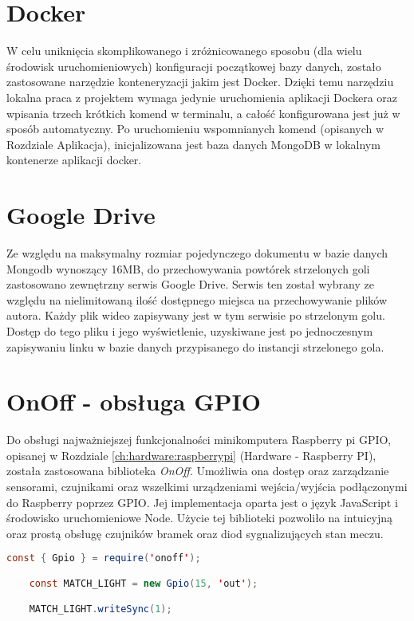 \label{section:docker}
\section{Docker}
W celu uniknięcia skomplikowanego i zróżnicowanego sposobu (dla wielu środowisk uruchomieniowych) konfiguracji początkowej bazy danych, zostało zastosowane narzędzie konteneryzacji jakim jest Docker. Dzięki temu narzędziu lokalna praca z projektem wymaga jedynie uruchomienia aplikacji Dockera oraz wpisania trzech krótkich komend w terminalu, a całość konfigurowana jest już w sposób automatyczny. Po uruchomieniu wspomnianych komend (opisanych w Rozdziale Aplikacja), inicjalizowana jest baza danych MongoDB w lokalnym kontenerze aplikacji docker.

\label{section:googleDrive}
\section{Google Drive}
Ze względu na maksymalny rozmiar pojedynczego dokumentu w bazie danych Mongodb wynoszący 16MB, do przechowywania powtórek strzelonych goli zastosowano zewnętrzny serwis Google Drive. Serwis ten został wybrany ze względu na nielimitowaną ilość dostępnego miejsca na przechowywanie plików autora. Każdy plik wideo zapisywany jest w tym serwisie po strzelonym golu. Dostęp do tego pliku i jego wyświetlenie, uzyskiwane jest po jednoczesnym zapisywaniu linku w bazie danych przypisanego do instancji strzelonego gola.

\section{OnOff - obsługa GPIO}
Do obsługi najważniejszej funkcjonalności minikomputera Raspberry pi GPIO, opisanej w Rozdziale \ref{ch:hardware:raspberrypi} (Hardware - Raspberry PI), została zastosowana biblioteka \textit{OnOff}. Umożliwia ona dostęp oraz zarządzanie sensorami, czujnikami oraz wszelkimi urządzeniami wejścia/wyjścia podłączonymi do Raspberry poprzez GPIO. Jej implementacja oparta jest o język JavaScript i środowisko uruchomieniowe Node. Użycie tej biblioteki pozwoliło na intuicyjną oraz prostą obsługę czujników bramek oraz diod sygnalizujących stan meczu.

\begin{lstlisting}[caption={Przykładowa implementacja uruchomienia diody sygnalizującej stan meczu}, language={Java}]
    const { Gpio } = require('onoff');

    const MATCH_LIGHT = new Gpio(15, 'out');

    MATCH_LIGHT.writeSync(1);
\end{lstlisting}

